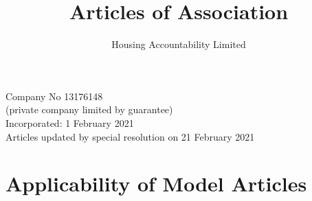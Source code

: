 \documentclass[10pt]{mk-articles-of-association}
\newcommand{\Name}[0]{Housing Accountability Limited}
\begin{document}
\title{
Articles of Association\\
}
\author{\Name{}\\
}
\date{}

\maketitle

\begin{center}
Company No 13176148\\
(private company limited by guarantee)\\
\medskip
Incorporated: 1 February 2021 \\
\medskip
Articles updated by special resolution on 21 February 2021
\end{center}


\section{Applicability of Model Articles}
\end{document}
